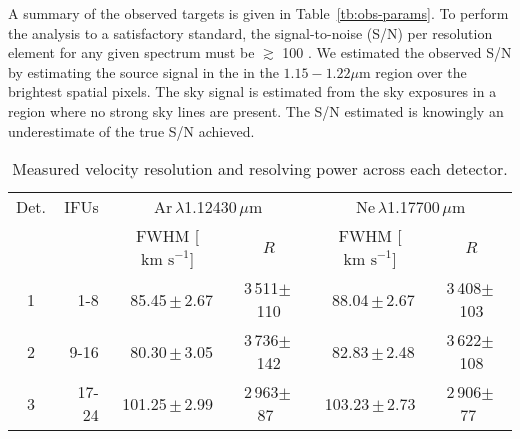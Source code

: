 \documentclass[iop]{emulateapj}
\def\lam{$\lambda$}
\def\kms{$\mbox{km s}^{-1}$}
\def\a{$\phantom{^\ast}$}
\def\o{$\phantom{0}$}
\begin{document}
A summary of the observed targets is given in
Table~\ref{tb:obs-params}.
To perform the analysis to a satisfactory standard,
the signal-to-noise (S/N) per resolution element for any given spectrum must be $\gtrsim$ 100
\citep{2014ApJ...788...58G}.
We estimated the observed S/N by estimating the source signal in the in the
$1.15-1.22\mu$m region over the brightest spatial pixels.
The sky signal is estimated from the sky exposures in a region where no strong sky lines are present.
The S/N estimated is knowingly an underestimate of the true S/N achieved.



\begin{table*}
\caption{Measured velocity resolution and resolving power across each detector.\label{tb:res}}
\scriptsize
\begin{center}
\begin{tabular}{crcccc}
\hline
\hline
Det. & IFUs & \multicolumn{2}{c}{Ar\,\lam1.12430\,$\mu$m}
            & \multicolumn{2}{c}{Ne\,\lam1.17700\,$\mu$m} \\
 & & FWHM [\kms] & $R$ & FWHM [\kms] & $R$ \\
  \hline
1 & 1-8 & \o85.45\,$\pm$\,2.67 & 3\,511$\pm$\,110 &
          \a88.04\,$\pm$\,2.67 & 3\,408$\pm$\,103 \\
2 & 9-16 & \o80.30\,$\pm$\,3.05 & 3\,736$\pm$\,142 &
          \a82.83\,$\pm$\,2.48 & 3\,622$\pm$\,108 \\
3 & 17-24 & 101.25\,$\pm$\,2.99 & 2\,963$\pm$\,87\a &
            103.23\,$\pm$\,2.73 & 2\,906$\pm$\,77\a \\
\hline
\end{tabular}
\end{center}
\end{table*}



\end{document}
